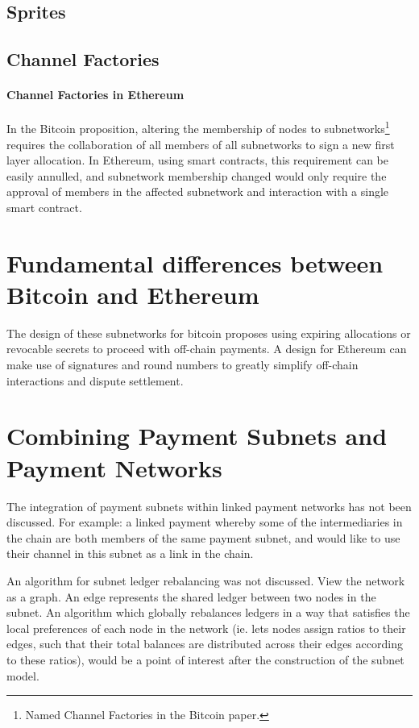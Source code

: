 \documentclass[12pt]{article}
\begin{document}
\subsection{Sprites}
\subsection{Channel Factories}

\paragraph{Channel Factories in Ethereum}
In the Bitcoin proposition, altering the membership of nodes to subnetworks\footnote{Named Channel Factories in the Bitcoin paper.} requires the collaboration of all members of all subnetworks to sign a new first layer allocation. In Ethereum, using smart contracts, this requirement can be easily annulled, and subnetwork membership changed would only require the approval of members in the affected subnetwork and interaction with a single smart contract.

\section{Fundamental differences between Bitcoin and Ethereum}
The design of these subnetworks for bitcoin proposes using expiring allocations or revocable secrets to proceed with off-chain payments. A design for Ethereum can make use of signatures and round numbers to greatly simplify off-chain interactions and dispute settlement.

\section{Combining Payment Subnets and Payment Networks}

The integration of payment subnets within linked payment networks has not been discussed. For example: a linked payment whereby some of the intermediaries in the chain are both members of the same payment subnet, and would like to use their channel in this subnet as a link in the chain.

An algorithm for subnet ledger rebalancing was not discussed. View the network as a graph. An edge represents the shared ledger between two nodes in the subnet. An algorithm which globally rebalances ledgers in a way that satisfies the local preferences of each node in the network (ie. lets nodes assign ratios to their edges, such that their total balances are distributed across their edges according to these ratios), would be a point of interest after the construction of the subnet model.
\end{document}
